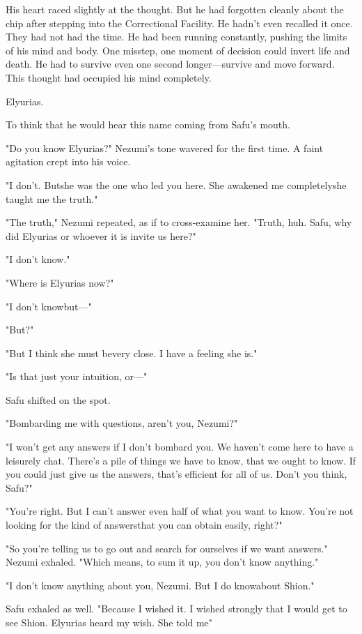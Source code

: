 His heart raced slightly at the thought. But he had forgotten cleanly
about the chip after stepping into the Correctional Facility. He hadn't
even recalled it once. They had not had the time. He had been running
constantly, pushing the limits of his mind and body. One misstep, one
moment of decision could invert life and death. He had to survive even
one second longer---survive and move forward. This thought had occupied
his mind completely.

Elyurias.

To think that he would hear this name coming from Safu's mouth.

"Do you know Elyurias?" Nezumi's tone wavered for the first time. A
faint agitation crept into his voice.

"I don't. But\el she was the one who led you here. She awakened me
completely\el she taught me the truth."

"The truth," Nezumi repeated, as if to cross-examine her. "Truth, huh.
Safu, why did Elyurias or whoever it is invite us here?"

"I don't know."

"Where is Elyurias now?"

"I don't know\el but---"

"But?"

"But I think she must be\el very close. I have a feeling she is."

"Is that just your intuition, or---"

Safu shifted on the spot.

"Bombarding me with questions, aren't you, Nezumi?"

"I won't get any answers if I don't bombard you. We haven't come here to
have a leisurely chat. There's a pile of things we have to know, that we
ought to know. If you could just give us the answers, that's efficient
for all of us. Don't you think, Safu?"

"You're right. But I can't answer even half of what you want to know.
You're not looking for the kind of answers\el that you can obtain
easily, right?"

"So you're telling us to go out and search for ourselves if we want
answers." Nezumi exhaled. "Which means, to sum it up, you don't know
anything."

"I don't know anything about you, Nezumi. But I do know\el about Shion."

Safu exhaled as well. "Because I wished it. I wished strongly that I
would get to see Shion. Elyurias heard my wish. She told me\el "

